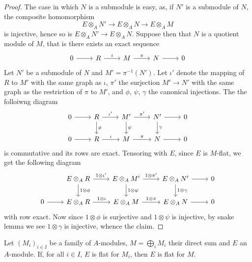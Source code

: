 \begin{proof}
The case in which $N$ is a submodule is easy, as, if $N'$ is a submodule of $N$, the composite homomorphism
\[E\otimes_AN'\to E\otimes_AN\to E\otimes_AM\]
is injective, hence so is $E\otimes_AN'\to E\otimes_AN$. Suppose then that $N$ is a quotient module of $M$, that is there exists an exact sequence
\[\begin{tikzcd}
0\ar[r]&R\ar[r,"i"]&M\ar[r,"\pi"]&N\ar[r]&0
\end{tikzcd}\]
Let $N'$ be a submodule of $N$ and $M'=\pi^{-1}(N')$. Let $\iota'$ denote the mapping of $R$ to $M'$ with the same graph as $\iota$, $\pi'$ the surjection $M'\to N'$ with the same graph as the restriction of $\pi$ to $M'$, and $\phi$, $\psi$, $\gamma$ the canonical injections. The the folloiwng diagram 
\[\begin{tikzcd}
0\ar[r]&R\ar[d,"\phi"]\ar[r,"\iota'"]&M'\ar[d,"\psi"]\ar[r,"\pi'"]&N'\ar[d,"\gamma"]\ar[r]&0\\
0\ar[r]&R\ar[r,"\iota"]&M\ar[r,"\pi"]&N\ar[r]&0
\end{tikzcd}\]
is commutative and its rows are exact. Tensoring with $E$, since $E$ is $M$-flat, we get the following diagram
\[\begin{tikzcd}
&E\otimes_AR\ar[d,"1\otimes\phi"]\ar[r,"1\otimes\iota'"]&E\otimes_AM'\ar[d,"1\otimes\psi"]\ar[r,"1\otimes\pi'"]&E\otimes_AN'\ar[d,"1\otimes\gamma"]\ar[r]&0\\
0\ar[r]&E\otimes_AR\ar[r,"1\otimes\iota"]&E\otimes_AM\ar[r,"1\otimes\pi"]&E\otimes_AN\ar[r]&0
\end{tikzcd}\]
with row exact. Now since $1\otimes\phi$ is surjective and $1\otimes\psi$ is injective, by snake lemma we see $1\otimes\gamma$ is injective, whence the claim. 
\end{proof}
\begin{lemma}\label{module flat and direct sum}
Let $(M_i)_{i\in I}$ be a family of $A$-modules, $M=\bigoplus_iM_i$ their direct sum and $E$ an $A$-module. If, for all $i\in I$, $E$ is flat for $M_i$, then $E$ is flat for $M$.
\end{lemma}

